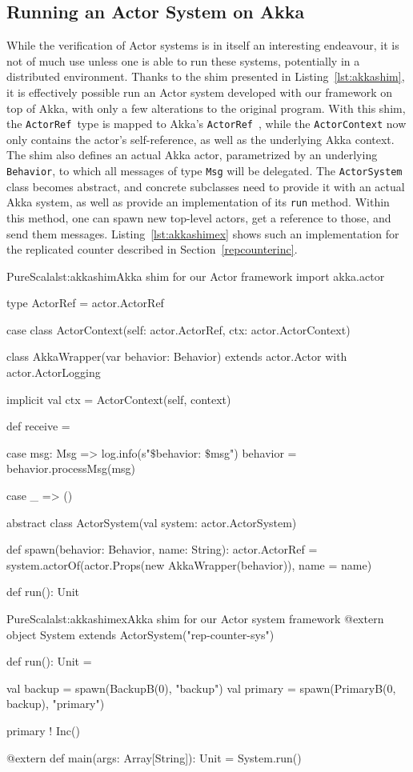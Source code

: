 \documentclass[a4paper,twoside]{article}
\newcommand{\InlineS}[1]{\lstinline[language=PureScala,basicstyle=\small\ttfamily,columns=fixed]|#1|}
\newcommand{\RefSec}[1]{Section~\ref{#1}}
\newcommand{\RefCode}[1]{Listing~\ref{#1}}
\newcommand{\ActorRef}{\InlineS{ActorRef}\ }
\newcommand{\stt}[1]{\texttt{\small{#1}}}
\begin{document}
\subsection{Running an Actor System on Akka}
\label{akka}

While the verification of Actor systems is in itself an interesting endeavour, it is not of much use unless one is able to run these systems, potentially in a distributed environment. Thanks to the shim presented in \RefCode{lst:akkashim}, it is effectively possible run an Actor system developed with our framework on top of Akka, with only a few alterations to the original program. With this shim, the \ActorRef type is mapped to Akka's \ActorRef, while the \stt{ActorContext} now only contains the actor's self-reference, as well as the underlying Akka context. The shim also defines an actual Akka actor, parametrized by an underlying \stt{Behavior}, to which all messages of type \stt{Msg} will be delegated. The \stt{ActorSystem} class becomes abstract, and concrete subclasses need to provide it with an actual Akka system, as well as provide an implementation of its \stt{run} method. Within this method, one can spawn new top-level actors, get a reference to those, and send them messages. \RefCode{lst:akkashimex} shows such an implementation for the replicated counter described in \RefSec{repcounterinc}.

\begin{Code}{PureScala}{lst:akkashim}{Akka shim for our Actor framework}
import akka.actor

type ActorRef = actor.ActorRef

case class ActorContext(self: actor.ActorRef, ctx: actor.ActorContext)

class AkkaWrapper(var behavior: Behavior)
  extends actor.Actor with actor.ActorLogging {

  implicit val ctx = ActorContext(self, context)

  def receive = {
    case msg: Msg =>
      log.info(s"$\$${behavior}: $\$${msg}")
      behavior = behavior.processMsg(msg)

    case _ => ()
  }
}

abstract class ActorSystem(val system: actor.ActorSystem) {
  def spawn(behavior: Behavior, name: String): actor.ActorRef = {
    system.actorOf(actor.Props(new AkkaWrapper(behavior)), name = name)
  }

  def run(): Unit
}
\end{Code}

\begin{Code}{PureScala}{lst:akkashimex}{Akka shim for our Actor system framework}
@extern
object System extends ActorSystem("rep-counter-sys") {
  def run(): Unit = {
    val backup  = spawn(BackupB(0), "backup")
    val primary = spawn(PrimaryB(0, backup), "primary")

    primary ! Inc()
  }
}

@extern
def main(args: Array[String]): Unit = {
  System.run()
}
\end{Code}
\end{document}
